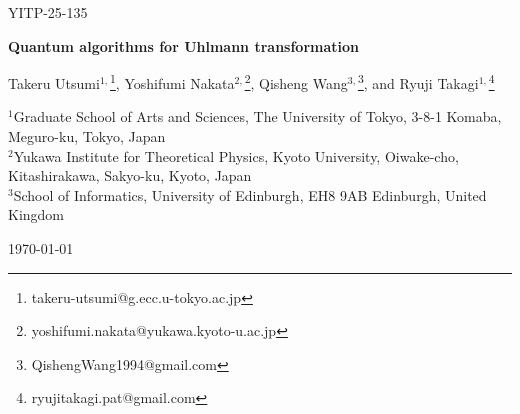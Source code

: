 \documentclass[superscriptaddress,11pt,bibliography]{article}
\theoremstyle{definition}
\theoremstyle{definition}
\begin{document}
\pagestyle{empty}

\begin{titlepage}



\begin{flushright}
YITP-25-135
\end{flushright}

\vspace*{0.5cm}




\begin{center}
{\LARGE\bfseries Quantum algorithms for Uhlmann transformation \par}



\vspace*{0.4cm}

{\large
Takeru Utsumi$^{1, }$\footnote{takeru-utsumi@g.ecc.u-tokyo.ac.jp},
Yoshifumi Nakata$^{2, }$\footnote{yoshifumi.nakata@yukawa.kyoto-u.ac.jp},
Qisheng Wang$^{3, }$\footnote{QishengWang1994@gmail.com}, and 
Ryuji Takagi$^{1, }$\footnote{ryujitakagi.pat@gmail.com}
}

\vspace{0.3cm}

{\small
$^{1}$Graduate School of Arts and Sciences, The University of Tokyo, 3-8-1 Komaba, Meguro-ku, Tokyo, Japan\\
$^{2}$Yukawa Institute for Theoretical Physics, Kyoto University, Oiwake-cho, Kitashirakawa, Sakyo-ku, Kyoto, Japan\\
$^{3}$School of Informatics, University of Edinburgh, EH8 9AB Edinburgh, United Kingdom
}



\vspace{0.2cm}


\today


\vspace*{-1cm}




\end{center}
\end{titlepage}
\end{document}
